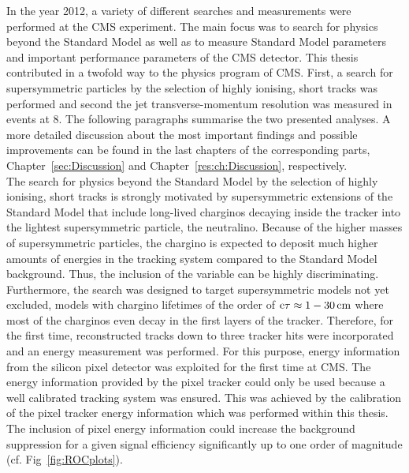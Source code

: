In the year 2012, a variety of different searches and measurements were performed at the CMS experiment.
The main focus was to search for physics beyond the Standard Model as well as to measure Standard Model parameters and important performance parameters of the CMS detector.
This thesis contributed in a twofold way to the physics program of CMS.
First, a search for supersymmetric particles by the selection of highly ionising, short tracks was performed and second the jet transverse-momentum resolution was measured in \GAMJET events at 8\tev.
The following paragraphs summarise the two presented analyses.
A more detailed discussion about the most important findings and possible improvements can be found in the last chapters of the corresponding parts, Chapter~\ref{sec:Discussion} and Chapter~\ref{res:ch:Discussion}, respectively.\\

The search for physics beyond the Standard Model by the selection of highly ionising, short tracks is strongly motivated by supersymmetric extensions of the Standard Model that include long-lived charginos decaying inside the tracker into the lightest supersymmetric particle, the neutralino.
Because of the higher masses of supersymmetric particles, the chargino is expected to deposit much higher amounts of energies in the tracking system compared to the Standard Model background.
Thus, the inclusion of the variable \dedx can be highly discriminating.
Furthermore, the search was designed to target supersymmetric models not yet excluded, \ie models with chargino lifetimes of the order of $\text{c}\tau \approx 1- 30\,\text{cm}$ where most of the charginos even decay in the first layers of the tracker.
Therefore, for the first time, reconstructed tracks down to three tracker hits were incorporated and an energy measurement was performed.
For this purpose, energy information from the silicon pixel detector was exploited for the first time at CMS.
The energy information provided by the pixel tracker could only be used because a well calibrated tracking system was ensured.
This was achieved by the calibration of the pixel tracker energy information which was performed within this thesis.
The inclusion of pixel energy information could increase the background suppression for a given signal efficiency significantly up to one order of magnitude (cf. Fig~\ref{fig:ROCplots}).

